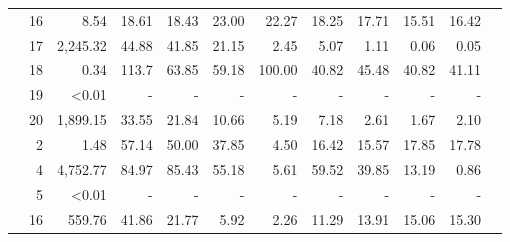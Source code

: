 \begin{table}
{\begin{tabular}{crrrrrrrrrrr}
& 16 & 8.54 & 18.61 & 18.43 & 23.00 & 22.27 & 18.25 & 17.71 & 15.51 & 16.42 \\ 
& 17 & 2,245.32 & 44.88 & 41.85 & 21.15 & 2.45 & 5.07 & 1.11 & 0.06 & 0.05 \\ 
& 18 & 0.34 & 113.7 & 63.85 & 59.18 & 100.00 & 40.82 & 45.48 & 40.82 & 41.11 \\ 
& 19 & <0.01 & - & - & - & - & - & - & - & - \\ 
& 20 & 1,899.15 & 33.55 & 21.84 & 10.66 & 5.19 & 7.18 & 2.61 & 1.67 & 2.10 \\ 
\noalign{\medskip}
\parbox[t]{2mm}{} &
2 & 1.48 & 57.14 & 50.00 & 37.85 & 4.50 & 16.42 & 15.57 & 17.85 & 17.78 \\
& 4 & 4,752.77 & 84.97 & 85.43 & 55.18 & 5.61 & 59.52 & 39.85 & 13.19 & 0.86 \\
& 5 & <0.01 & - & - & - & - & - & - & - & - \\
& 16 & 559.76 & 41.86 & 21.77 & 5.92 & 2.26 & 11.29 & 13.91 & 15.06 & 15.30 \\
\hline
\end{tabular}
}
\end{table} 

